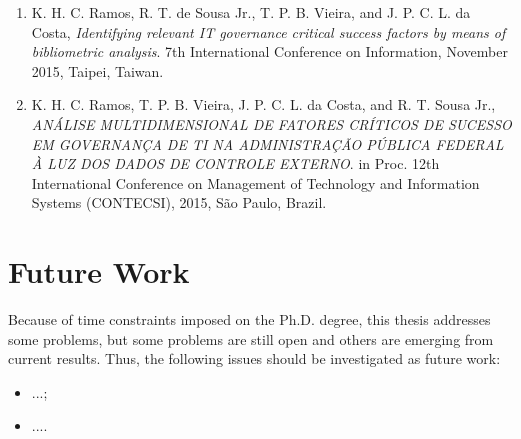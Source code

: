 \begin{enumerate}
\begin{enumerate}
		\item K. H. C. Ramos, R. T. de Sousa Jr., T. P. B. Vieira, and J. P. C. L. da Costa, \textit{Identifying relevant IT governance critical success factors by means of bibliometric analysis}. 7th International Conference on Information, November 2015, Taipei, Taiwan.
		\item K. H. C. Ramos, T. P. B. Vieira, J. P. C. L. da Costa, and R. T. Sousa Jr., \textit{ANÁLISE MULTIDIMENSIONAL DE FATORES CRÍTICOS DE SUCESSO EM GOVERNANÇA DE TI NA ADMINISTRAÇÃO PÚBLICA FEDERAL À LUZ DOS DADOS DE CONTROLE EXTERNO}. in Proc. 12th International Conference on Management of Technology and Information Systems (CONTECSI), 2015, São Paulo, Brazil.
	\end{enumerate}
\end{enumerate}

\section{Future Work}
\label{sc:conc_futurework}

Because of time constraints imposed on the Ph.D. degree, this thesis addresses some problems, but some problems are still open and others are emerging from current results. Thus, the following issues should be investigated as future work:

\begin{itemize}
	\item ...;
	\item ....
\end{itemize}
